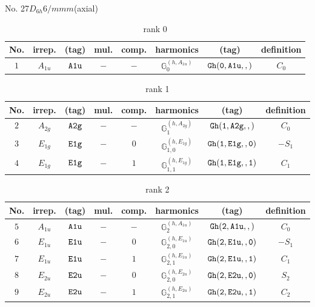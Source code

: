 \documentclass[fleqn,8pt]{jsarticle}
\begin{document}
\setcounter{MaxMatrixCols}{16}

\begin{center}
\LARGE
No. 27\quad$D_{6h}$\quad$6/mmm$\quad[ hexagonal ] (axial)
\end{center}
\begin{table}[ht!]
\begin{center}
\caption{rank 0}
\renewcommand{\arraystretch}{1.3}
\begin{tabular}{cccccccc} \hline \hline
No. & irrep. & (tag) & mul. & comp. & harmonics & (tag) & definition \\ \hline
$ 1 $ & $ A_{1u} $ & $ {\tt A1u} $ & $ - $ & $ - $ & $ \mathbb{G}_{0}^{(h,A_{1u})} $ & $ {\tt Gh(0,A1u,,)} $ & $ C_{0} $ \\
 \hline \hline
\end{tabular}
\end{center}
\end{table}
\begin{table}[ht!]
\begin{center}
\caption{rank 1}
\renewcommand{\arraystretch}{1.3}
\begin{tabular}{cccccccc} \hline \hline
No. & irrep. & (tag) & mul. & comp. & harmonics & (tag) & definition \\ \hline
$ 2 $ & $ A_{2g} $ & $ {\tt A2g} $ & $ - $ & $ - $ & $ \mathbb{G}_{1}^{(h,A_{2g})} $ & $ {\tt Gh(1,A2g,,)} $ & $ C_{0} $ \\
$ 3 $ & $ E_{1g} $ & $ {\tt E1g} $ & $ - $ & $ 0 $ & $ \mathbb{G}_{1,0}^{(h,E_{1g})} $ & $ {\tt Gh(1,E1g,,0)} $ & $ - S_{1} $ \\
$ 4 $ & $ E_{1g} $ & $ {\tt E1g} $ & $ - $ & $ 1 $ & $ \mathbb{G}_{1,1}^{(h,E_{1g})} $ & $ {\tt Gh(1,E1g,,1)} $ & $ C_{1} $ \\
 \hline \hline
\end{tabular}
\end{center}
\end{table}
\begin{table}[ht!]
\begin{center}
\caption{rank 2}
\renewcommand{\arraystretch}{1.3}
\begin{tabular}{cccccccc} \hline \hline
No. & irrep. & (tag) & mul. & comp. & harmonics & (tag) & definition \\ \hline
$ 5 $ & $ A_{1u} $ & $ {\tt A1u} $ & $ - $ & $ - $ & $ \mathbb{G}_{2}^{(h,A_{1u})} $ & $ {\tt Gh(2,A1u,,)} $ & $ C_{0} $ \\
$ 6 $ & $ E_{1u} $ & $ {\tt E1u} $ & $ - $ & $ 0 $ & $ \mathbb{G}_{2,0}^{(h,E_{1u})} $ & $ {\tt Gh(2,E1u,,0)} $ & $ - S_{1} $ \\
$ 7 $ & $ E_{1u} $ & $ {\tt E1u} $ & $ - $ & $ 1 $ & $ \mathbb{G}_{2,1}^{(h,E_{1u})} $ & $ {\tt Gh(2,E1u,,1)} $ & $ C_{1} $ \\
$ 8 $ & $ E_{2u} $ & $ {\tt E2u} $ & $ - $ & $ 0 $ & $ \mathbb{G}_{2,0}^{(h,E_{2u})} $ & $ {\tt Gh(2,E2u,,0)} $ & $ S_{2} $ \\
$ 9 $ & $ E_{2u} $ & $ {\tt E2u} $ & $ - $ & $ 1 $ & $ \mathbb{G}_{2,1}^{(h,E_{2u})} $ & $ {\tt Gh(2,E2u,,1)} $ & $ C_{2} $ \\
 \hline \hline
\end{tabular}
\end{center}
\end{table}
\end{document}
